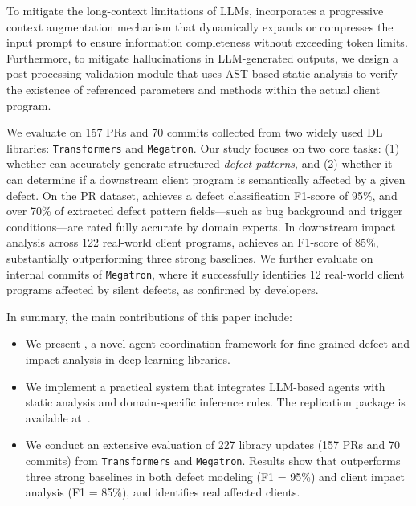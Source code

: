 To mitigate the long-context limitations of LLMs, \appname incorporates a progressive context augmentation mechanism that dynamically expands or compresses the input prompt to ensure information completeness without exceeding token limits.
Furthermore, to mitigate hallucinations in LLM-generated outputs, we design a post-processing validation module that uses AST-based static analysis to verify the existence of referenced parameters and methods within the actual client program. 

We evaluate \textbf{\appname} on 157 PRs and 70 commits collected from two widely used DL libraries: \texttt{Transformers} and \texttt{Megatron}.
Our study focuses on two core tasks: (1) whether \appname can accurately generate structured \textit{defect patterns}, and (2) whether it can determine if a downstream client program is semantically affected by a given defect.
On the PR dataset, \appname achieves a defect classification F1-score of 95\%, and over 70\% of extracted defect pattern fields—such as bug background and trigger conditions—are rated fully accurate by domain experts.
In downstream impact analysis across 122 real-world client programs, \appname achieves an F1-score of 85\%, substantially outperforming three strong baselines.
We further evaluate \appname on internal commits of \texttt{Megatron}, where it successfully identifies 12 real-world client programs affected by silent defects, as confirmed by developers.

In summary, the main contributions of this paper include:
\begin{itemize}[leftmargin=*]
\item We present \textbf{\appname}, a novel agent coordination framework for fine-grained defect and impact analysis in deep learning libraries. 
\item We implement a practical system that integrates LLM-based agents with static analysis and domain-specific inference rules. 
The replication package is available at~\cite{depradar}.
\item We conduct an extensive evaluation of 227 library updates (157 PRs and 70 commits) from \texttt{Transformers} and \texttt{Megatron}. 
Results show that \appname outperforms three strong baselines in both defect modeling (F1 = 95\%) and client impact analysis (F1 = 85\%), and identifies real affected clients.
\end{itemize}

